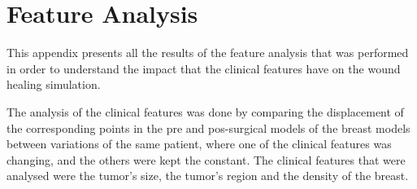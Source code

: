 \chapter{Feature Analysis} \label{ap1:feat_analysis}

This appendix presents all the results of the feature analysis that was performed in order to understand the impact that the clinical features have on the wound healing simulation.

The analysis of the clinical features was done by comparing the displacement of the corresponding points in the pre and pos-surgical models of the breast models between variations of the same patient, where one of the clinical features was changing, and the others were kept the constant. The clinical features that were analysed were the tumor's size, the tumor's region and the density of the breast.




